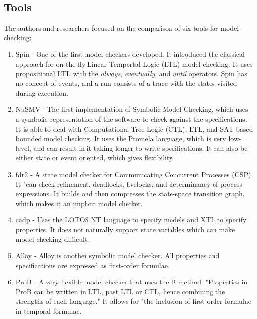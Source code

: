 \documentclass[conference]{IEEEtran}
\begin{document}
\subsection{Tools}
The authors and researchers focused on the comparison of six tools for model-checking:
\begin{enumerate}

\item Spin - One of the first model checkers developed. It introduced the classical approach for on-the-fly Linear Temportal Logic (LTL) model checking. It uses propositional LTL with the \emph{always}, \emph{eventually}, and \emph{until} operators. Spin has no concept of events, and a run consists of a trace with the states visited during execution.

\item NuSMV - The first implementation of Symbolic Model Checking, which uses a symbolic representation of the software to check against the specifications. It is able to deal with Computational Tree Logic (CTL), LTL, and SAT-based bounded model checking. It uses the Promela language, which is very low-level, and can result in it taking longer to write specifications. It can also be either state or event oriented, which gives flexibility.

\item fdr2 - A state model checker for Communicating Concurrent Processes (CSP). It "can check refinement, deadlocks, livelocks, and determinancy of process expressions. It builds and then compresses the state-space transition graph, which makes it an implicit model checker.

\item cadp - Uses the LOTOS NT language to specify models and XTL to specify properties. It does not naturally support state variables which can make model checking difficult.

\item Alloy - Alloy is another symbolic model checker. All properties and specifications are expressed as first-order formulae.

\item ProB - A very flexible model checker that uses the B method. "Properties in ProB can be written in LTL, past LTL or CTL, hence combining the strengths of each language." It allows for "the inclusion of first-order formulae in temporal formulae.

\end{enumerate}
\end{document}

